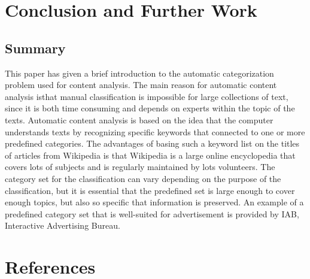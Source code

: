 \documentclass[english,a4paper]{ifimaster}
\begin{document}
\part{Conclusion and Further Work}
\chapter{Summary}
This paper has given a brief introduction to the automatic categorization problem used for content analysis. The main reason for automatic content analysis isthat manual classification is impossible for large collections of text, since it is both time consuming and  depends on experts within the topic of the texts. Automatic content analysis is based on the idea that the computer understands texts by recognizing specific keywords that  connected to one or more predefined categories. The advantages of basing such a keyword list on the titles of articles from Wikipedia is that Wikipedia is a large online encyclopedia that covers lots of subjects and is regularly maintained by lots volunteers. The category set for the classification can vary depending on the purpose of the classification, but it is essential that the predefined set is large enough to cover enough topics, but also so specific that information is preserved. An example of a predefined category set that is well-suited for advertisement is provided by IAB, Interactive Advertising Bureau. 




\backmatter{}
\part{References}
\printbibliography
\end{document}
